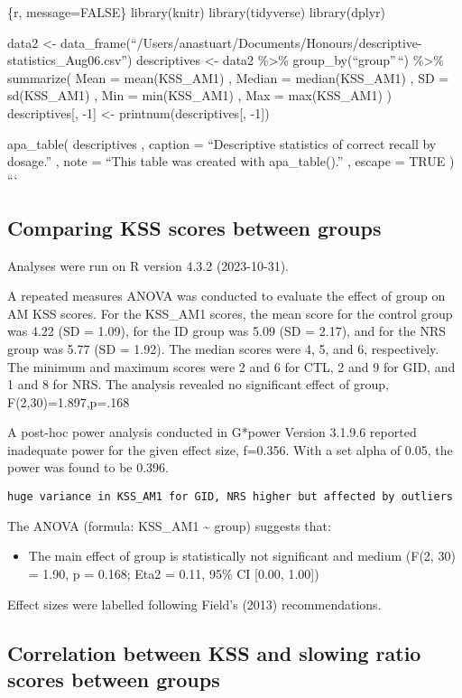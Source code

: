\documentclass[
]{article}
\providecommand{\tightlist}{%
  \setlength{\itemsep}{0pt}\setlength{\parskip}{0pt}}
\begin{document}
\{r, message=FALSE\} library(knitr) library(tidyverse) library(dplyr)

data2 \textless-
data\_frame(``/Users/anastuart/Documents/Honours/descriptive-statistics\_Aug06.csv'')
descriptives \textless- data2 \%\textgreater\% group\_by(``group''\,``)
\%\textgreater\% summarize( Mean = mean(KSS\_AM1) , Median =
median(KSS\_AM1) , SD = sd(KSS\_AM1) , Min = min(KSS\_AM1) , Max =
max(KSS\_AM1) ) descriptives{[}, -1{]} \textless-
printnum(descriptives{[}, -1{]})

apa\_table( descriptives , caption = ``Descriptive statistics of correct
recall by dosage.'' , note = ``This table was created with
apa\_table().'' , escape = TRUE ) ```

\subsection{Comparing KSS scores between
groups}\label{comparing-kss-scores-between-groups}

Analyses were run on R version 4.3.2 (2023-10-31).

A repeated measures ANOVA was conducted to evaluate the effect of group
on AM KSS scores. For the KSS\_AM1 scores, the mean score for the
control group was 4.22 (SD = 1.09), for the ID group was 5.09 (SD =
2.17), and for the NRS group was 5.77 (SD = 1.92). The median scores
were 4, 5, and 6, respectively. The minimum and maximum scores were 2
and 6 for CTL, 2 and 9 for GID, and 1 and 8 for NRS. The analysis
revealed no significant effect of group, F(2,30)=1.897,p=.168

A post-hoc power analysis conducted in G*power Version 3.1.9.6 reported
inadequate power for the given effect size, f=0.356. With a set alpha of
0.05, the power was found to be 0.396.

\texttt{huge\ variance\ in\ KSS\_AM1\ for\ GID,\ NRS\ higher\ but\ affected\ by\ outliers}

The ANOVA (formula: KSS\_AM1 \textasciitilde{} group) suggests that:

\begin{itemize}
\tightlist
\item
  The main effect of group is statistically not significant and medium
  (F(2, 30) = 1.90, p = 0.168; Eta2 = 0.11, 95\% CI {[}0.00, 1.00{]})
\end{itemize}

Effect sizes were labelled following Field's (2013) recommendations.

\subsection{Correlation between KSS and slowing ratio scores between
groups}\label{correlation-between-kss-and-slowing-ratio-scores-between-groups}
\end{document}
